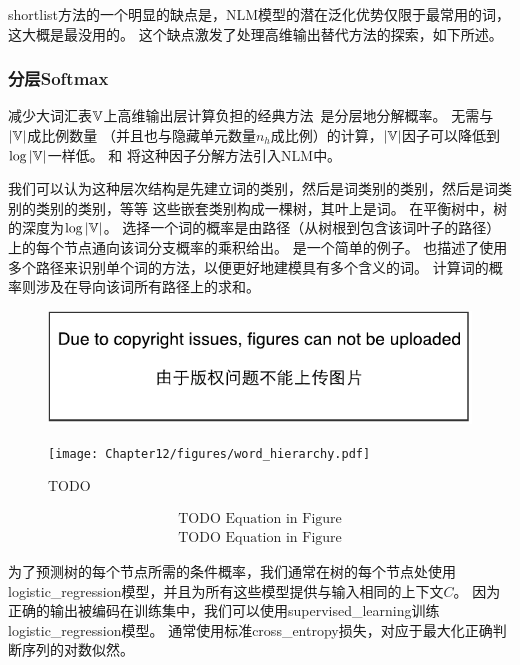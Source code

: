 \gls{shortlist}方法的一个明显的缺点是，\gls{NLM}模型的潜在泛化优势仅限于最常用的词，这大概是最没用的。
这个缺点激发了处理高维输出替代方法的探索，如下所述。

\subsubsection{分层Softmax}
减少大词汇表$\mathbb{V}$上高维输出层计算负担的经典方法~\citep{Goodman2001}是分层地分解概率。
无需与$|\mathbb{V}|$成比例数量 （并且也与隐藏单元数量$n_h$成比例）的计算，$|\mathbb{V}|$因子可以降低到$\log |\mathbb{V}|$一样低。
\citet{BengioTR1215}和\citet{Morin+Bengio-2005-small} 将这种因子分解方法引入\gls{NLM}中。


我们可以认为这种层次结构是先建立词的类别，然后是词类别的类别，然后是词类别的类别的类别，等等
这些嵌套类别构成一棵树，其叶上是词。
在平衡树中，树的深度为$\log |\mathbb{V}|$。
选择一个词的概率是由路径（从树根到包含该词叶子的路径）上的每个节点通向该词分支概率的乘积给出。
是一个简单的例子。
\citet{Mnih+Hinton-2009}也描述了使用多个路径来识别单个词的方法，以便更好地建模具有多个含义的词。
计算词的概率则涉及在导向该词所有路径上的求和。
\begin{figure}[htp]
\centering
\ifOpenSource
\centerline{\includegraphics{figure.pdf}}
\else
\texttt{[image: Chapter12/figures/word\_hierarchy.pdf]}
\fi
\captionsetup{singlelinecheck=off}
\caption{TODO}
\label{fig:chap12_word_hierarchy}
\end{figure}
\begin{align}
    \text{TODO Equation in Figure}  \\
    \text{TODO Equation in Figure}
\end{align}

为了预测树的每个节点所需的条件概率，我们通常在树的每个节点处使用\gls{logistic_regression}模型，并且为所有这些模型提供与输入相同的上下文$C$。
因为正确的输出被编码在训练集中，我们可以使用\gls{supervised_learning}训练\gls{logistic_regression}模型。
通常使用标准\gls{cross_entropy}损失，对应于最大化正确判断序列的对数似然。

